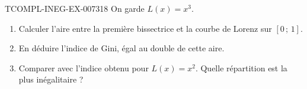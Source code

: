 \begin{exercice}{TCOMPL-INEG-EX-007}{3}{18}
On garde $L(x)=x^3$.
\begin{enumerate}
  \item Calculer l'aire entre la première bissectrice et la courbe de Lorenz
        sur $[0\,;\,1]$.
  \item En déduire l'indice de Gini, égal au double de cette aire.
  \item Comparer avec l'indice obtenu pour $L(x)=x^2$. Quelle répartition est
        la plus inégalitaire ?
\end{enumerate}
\end{exercice}
